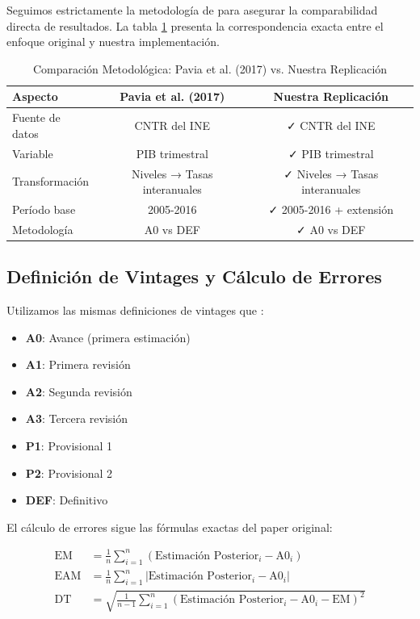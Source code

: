 \documentclass[12pt,a4paper]{article}
\begin{document}
Seguimos estrictamente la metodología de \citet{pavia2017} para asegurar la comparabilidad directa de resultados. La tabla \ref{tab:metodologia_comparacion} presenta la correspondencia exacta entre el enfoque original y nuestra implementación.

\begin{table}[h]
\centering
\caption{Comparación Metodológica: Pavia et al. (2017) vs. Nuestra Replicación}
\label{tab:metodologia_comparacion}
\begin{tabular}{lcc}
\toprule
\textbf{Aspecto} & \textbf{Pavia et al. (2017)} & \textbf{Nuestra Replicación} \\
\midrule
Fuente de datos & CNTR del INE & ✓ CNTR del INE \\
Variable & PIB trimestral & ✓ PIB trimestral \\
Transformación & Niveles → Tasas interanuales & ✓ Niveles → Tasas interanuales \\
Período base & 2005-2016 & ✓ 2005-2016 + extensión \\
Metodología & A0 vs DEF & ✓ A0 vs DEF \\
\bottomrule
\end{tabular}
\end{table}

\subsection{Definición de Vintages y Cálculo de Errores}

Utilizamos las mismas definiciones de vintages que \citet{pavia2017}:

\begin{itemize}
\item \textbf{A0}: Avance (primera estimación)
\item \textbf{A1}: Primera revisión
\item \textbf{A2}: Segunda revisión  
\item \textbf{A3}: Tercera revisión
\item \textbf{P1}: Provisional 1
\item \textbf{P2}: Provisional 2
\item \textbf{DEF}: Definitivo
\end{itemize}

El cálculo de errores sigue las fórmulas exactas del paper original:

\begin{align}
\text{EM} &= \frac{1}{n}\sum_{i=1}^{n}(\text{Estimación Posterior}_i - \text{A0}_i) \label{eq:em}\\
\text{EAM} &= \frac{1}{n}\sum_{i=1}^{n}|\text{Estimación Posterior}_i - \text{A0}_i| \label{eq:eam}\\
\text{DT} &= \sqrt{\frac{1}{n-1}\sum_{i=1}^{n}(\text{Estimación Posterior}_i - \text{A0}_i - \text{EM})^2} \label{eq:dt}
\end{align}
\end{document}
